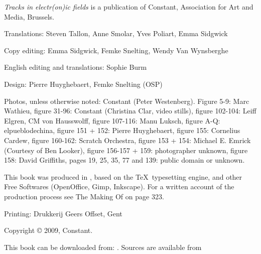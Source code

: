 \blank
\tfx\setupinterlinespace
{\em Tracks in electr(on)ic fields} is a publication of Constant, Association for Art and Media, Brussels.

Translations: Steven Tallon, Anne Smolar, Yves Poliart, Emma Sidgwick

Copy editing: Emma Sidgwick, Femke Snelting, Wendy Van Wynsberghe

English editing and translations: Sophie Burm

Design: Pierre Huyghebaert, Femke Snelting (OSP)

Photos, unless otherwise noted: Constant (Peter Westenberg). Figure 5-9: Marc Wathieu, figure 31-96: Constant (Christina Clar, video
stills), figure 102-104: Leiff Elgren, CM von Hausswolff, figure 107-116: Manu Luksch, figure A-Q: elpueblodechina, figure 151 + 152:
Pierre Huyghebaert, figure 155: Cornelius Cardew, figure 160-162: Scratch Orchestra, figure 153 + 154: Michael E. Emrick (Courtesy of Ben
Looker), figure 156-157 + 159: photographer unknown, figure 158: David Griffiths, pages 19, 25, 35, 77 and 139: public domain or unknown. 

This book was produced in \ConTeXt, based on the \TeX\ typesetting engine, and other Free Softwares (OpenOffice, Gimp, Inkscape). For a written account of the production process see The Making Of on page 323.

Printing: Drukkerij Geers Offset, Gent

\blank

Copyright © 2009, Constant. 




\blank

This book can be downloaded from: . Sources are available from 

\page

\setupcaptions[location=bottom,align=middle,style=\tfx\setupinterlinespace,width=10cm]
\startcolumns[n=2,balance=yes]
\stopcolumns